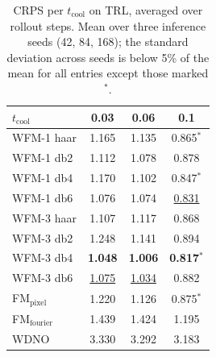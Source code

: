 \begin{table}[ht]
\centering
\caption{CRPS per $t_{\mathrm{cool}}$ on TRL, averaged over rollout steps. Mean over three inference seeds (42, 84, 168); the standard deviation across seeds is below 5\% of the mean for all entries except those marked $^{*}$.}
\label{tab:ablation_trl_crps_tcool_main}
\begin{tabular}{lccc}
\toprule
$t_{\mathrm{cool}}$ & 0.03 & 0.06 & 0.1 \\
\midrule
WFM-1 haar & 1.165 & 1.135 & 0.865$^{*}$ \\
WFM-1 db2 & 1.112 & 1.078 & 0.878 \\
WFM-1 db4 & 1.170 & 1.102 & 0.847$^{*}$ \\
WFM-1 db6 & 1.076 & 1.074 & \underline{0.831} \\
\midrule
WFM-3 haar & 1.107 & 1.117 & 0.868 \\
WFM-3 db2 & 1.248 & 1.141 & 0.894 \\
WFM-3 db4 & \textbf{1.048} & \textbf{1.006} & \textbf{0.817}$^{*}$ \\
WFM-3 db6 & \underline{1.075} & \underline{1.034} & 0.882 \\
\midrule
FM$_\text{pixel}$ & 1.220 & 1.126 & 0.875$^{*}$ \\
FM$_\text{fourier}$ & 1.439 & 1.424 & 1.195 \\
WDNO & 3.330 & 3.292 & 3.183 \\
\bottomrule
\end{tabular}
\end{table}
